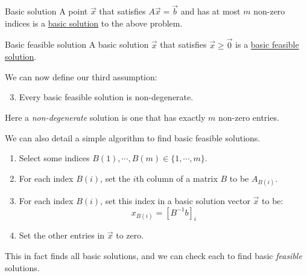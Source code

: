 \documentclass[../Main.tex]{subfiles}
\begin{document}
\begin{definition}{Basic solution}
    A point $\vec{x}$ that satisfies $A\vec{x} = \vec{b}$ and has at most $m$ non-zero indices is a \underline{basic solution} to the above problem.
\end{definition}
\begin{definition}{Basic feasible solution}
    A basic solution $\vec{x}$ that satisfies $\vec{x} \geq \vec{0}$ is a \underline{basic feasible solution}.
\end{definition}

We can now define our third assumption:
\begin{enumerate}
    \setcounter{enumi}{2}
    \item Every basic feasible solution is non-degenerate.
\end{enumerate}
Here a \textit{non-degenerate} solution is one that has exactly $m$ non-zero entries.

We can also detail a simple algorithm to find basic feasible solutions.
\begin{enumerate}
    \item Select some indices $B(1), \cdots, B(m) \in \{1, \cdots, m\}$.
    \item For each index $B(i)$, set the $i$th column of a matrix $B$ to be $A_{B(i)}$.
    \item For each index $B(i)$, set this index in a basic solution vector $\vec{x}$ to be:
        \begin{equation*}
            x_{B(i)} = \left[B^{-1} b\right]_i
        \end{equation*}
    \item Set the other entries in $\vec{x}$ to zero.
\end{enumerate}
This in fact finds all basic solutions, and we can check each to find basic \textit{feasible} solutions.
\end{document}
